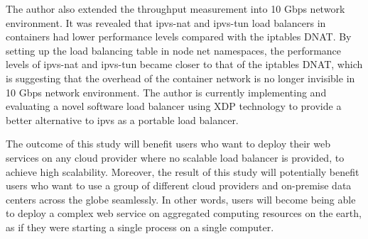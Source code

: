 The author also extended the throughput measurement into 10 Gbps network environment.
It was revealed that ipvs-nat and ipvs-tun load balancers in containers had lower performance levels compared with the iptables DNAT.
By setting up the load balancing table in node net namespaces, the performance levels of ipvs-nat and ipvs-tun became closer to that of the iptables DNAT,
which is suggesting that the overhead of the container network is no longer invisible in 10 Gbps network environment.
The author is currently implementing and evaluating a novel software load balancer using XDP technology to provide a better alternative to ipvs as a portable load balancer.

The outcome of this study will benefit users who want to deploy their web services on any cloud provider where no scalable load balancer is provided, to achieve high scalability.
Moreover, the result of this study will potentially benefit users who want to use a group of different cloud providers and on-premise data centers across the globe seamlessly.
In other words, users will become being able to deploy a complex web service on aggregated computing resources on the earth, as if they were starting a single process on a single computer.

